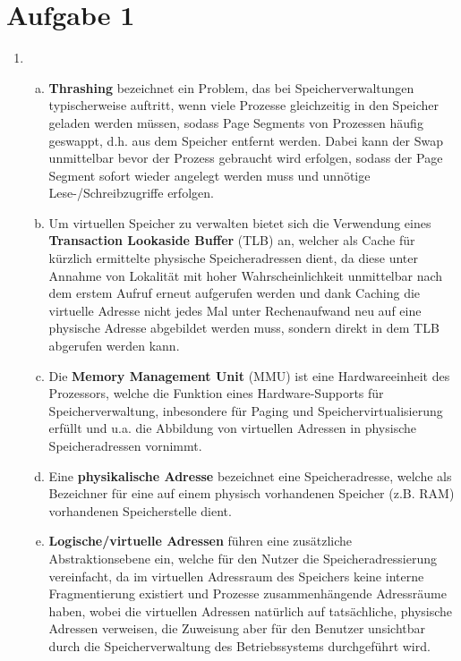 \documentclass[numbers=noendperiod]{scrartcl}
\begin{document}
\section*{Aufgabe 1}
\begin{enumerate}[1.]
	\item \begin{enumerate}[a)]
		\item \textbf{Thrashing} bezeichnet ein Problem, das bei Speicherverwaltungen typischerweise auftritt, wenn viele Prozesse gleichzeitig in den Speicher geladen werden müssen, sodass Page Segments von Prozessen häufig geswappt, d.h. aus dem Speicher entfernt werden. Dabei kann der Swap unmittelbar bevor der Prozess gebraucht wird erfolgen, sodass der Page Segment sofort wieder angelegt werden muss und unnötige Lese-/Schreibzugriffe erfolgen.
		
		\item Um virtuellen Speicher zu verwalten bietet sich die Verwendung eines \textbf{Transaction Lookaside Buffer} (TLB) an, welcher als Cache für kürzlich ermittelte physische Speicheradressen dient, da diese unter Annahme von Lokalität mit hoher Wahrscheinlichkeit unmittelbar nach dem erstem Aufruf erneut aufgerufen werden und dank Caching die virtuelle Adresse nicht jedes Mal unter Rechenaufwand neu auf eine physische Adresse abgebildet werden muss, sondern direkt in dem TLB abgerufen werden kann.
		
		\item Die \textbf{Memory Management Unit} (MMU) ist eine Hardwareeinheit des Prozessors, welche die Funktion eines Hardware-Supports für Speicherverwaltung, inbesondere für Paging und Speichervirtualisierung erfüllt und u.a. die Abbildung von virtuellen Adressen in physische Speicheradressen vornimmt.
		
		\item Eine \textbf{physikalische Adresse} bezeichnet eine Speicheradresse, welche als Bezeichner für eine auf einem physisch vorhandenen Speicher (z.B. RAM) vorhandenen Speicherstelle dient.
		
		\item \textbf{Logische/virtuelle Adressen} führen eine zusätzliche Abstraktionsebene ein, welche für den Nutzer die Speicheradressierung vereinfacht, da im virtuellen Adressraum des Speichers keine interne Fragmentierung existiert und Prozesse zusammenhängende Adressräume haben, wobei die virtuellen Adressen natürlich auf tatsächliche, physische Adressen verweisen, die Zuweisung aber für den Benutzer unsichtbar durch die Speicherverwaltung des Betriebssystems durchgeführt wird.
		

\end{enumerate}
\end{enumerate}
\end{document}
